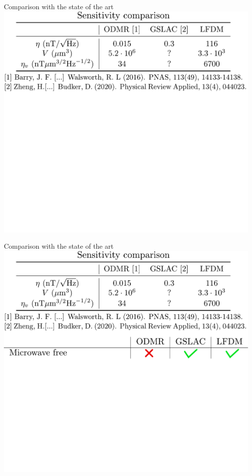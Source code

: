 \documentclass{beamer}
\begin{document}
\begin{frame}{Comparison with the state of the art}
\centering
\includegraphics[width=\textwidth,height=0.85\textheight,keepaspectratio]{Slide_comparison_litterature_f-5}
\end{frame}

\begin{frame}{Comparison with the state of the art}
\centering
\includegraphics[width=\textwidth,height=0.85\textheight,keepaspectratio]{Slide_comparison_litterature_f-4}
\end{frame}
\end{document}
